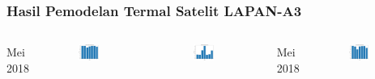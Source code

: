\documentclass[8pt]{beamer}
\begin{document}
\begin{frame}
  \frametitle{Hasil Pemodelan Termal Satelit LAPAN-A3}
  \begin{columns}[T]
     Mei 2018
      \begin{figure}
          \includegraphics[width=0.6\textwidth]{figure/r2_2018-05-19.png}
      \end{figure}
      \begin{figure}
          \includegraphics[width=0.6\textwidth]{figure/rmse_2018-05-19.png}
      \end{figure}
     Mei 2018
      \begin{figure}
          \includegraphics[width=0.6\textwidth]{figure/r2_2018-05-20.png}

\end{figure}
\end{columns}
\end{frame}
\end{document}
